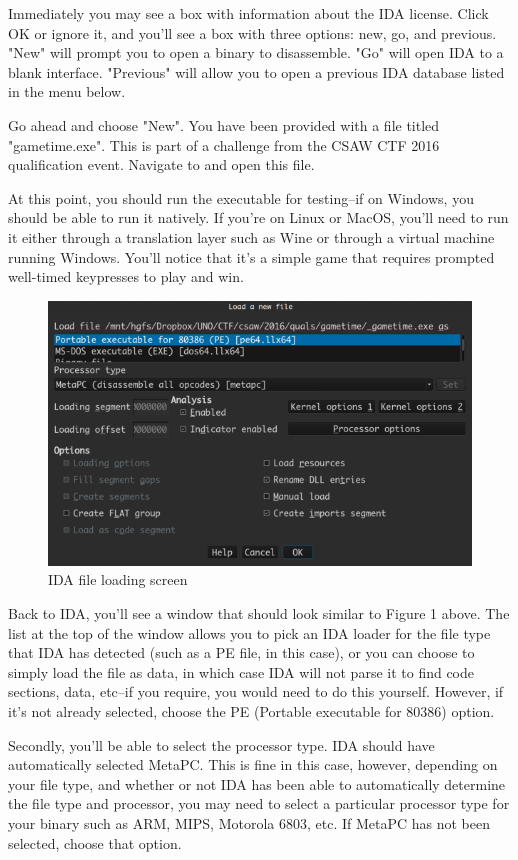 \documentclass[11pt]{article}
\begin{document}
Immediately you may see a box with information about the IDA license. Click OK
or ignore it, and you'll see a box with three options: new, go, and previous.
"New" will prompt you to open a binary to disassemble. "Go" will open IDA to a
blank interface. "Previous" will allow you to open a previous IDA database
listed in the menu below.

Go ahead and choose "New". You have been provided with a file titled
"gametime.exe". This is part of a challenge from the CSAW CTF 2016
qualification event. Navigate to and open this file.

At this point, you should run the executable for testing--if on Windows, you
should be able to run it natively. If you're on Linux or MacOS, you'll need to
run it either through a translation layer such as Wine or through a virtual
machine running Windows. You'll notice that it's a simple game that requires
prompted well-timed keypresses to play and win.

\begin{figure}[H]
\centering
\includegraphics[width=.9\linewidth]{./gametime_load_prompt.png}
\caption{\label{Figure-1}IDA file loading screen}
\end{figure}

Back to IDA, you'll see a window that should look similar to Figure 1 above.
The list at the top of the window allows you to pick an IDA loader for the
file type that IDA has detected (such as a PE file, in this case), or you can
choose to simply load the file as data, in which case IDA will not parse it
to find code sections, data, etc--if you require, you would need to do this
yourself. However, if it's not already selected, choose the PE (Portable
executable for 80386) option.

Secondly, you'll be able to select the processor type. IDA should have
automatically selected MetaPC. This is fine in this case, however, depending
on your file type, and whether or not IDA has been able to automatically
determine the file type and processor, you may need to select a particular
processor type for your binary such as ARM, MIPS, Motorola 6803, etc. If
MetaPC has not been selected, choose that option.
\end{document}
